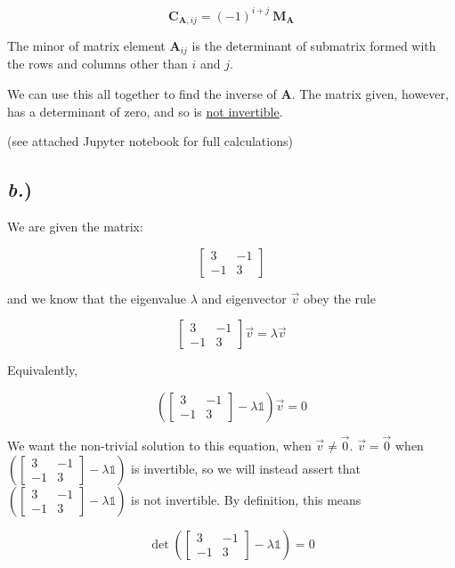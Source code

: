 \documentclass{article}
\begin{document}
$$ \textbf{C}_{\textbf{A},ij} = (-1)^{i+j} \ \textbf{M}_{\textbf{A}} $$

The minor of matrix element $\textbf{A}_{ij}$ is the determinant of submatrix formed with the rows and columns other than $i$ and $j$.

We can use this all together to find the inverse of $\textbf{A}$. The matrix given, however, has a determinant of zero, and so is \underline{not invertible}.

(see attached Jupyter notebook for full calculations)


\subsection*{\textit{b.})}

We are given the matrix:

$$\begin{bmatrix}
3 	&	-1	\\
-1	&	3	\end{bmatrix}$$

and we know that the eigenvalue $\lambda$ and eigenvector $\vec{v}$ obey the rule

$$\begin{bmatrix}
3 	&	-1	\\
-1	&	3	\end{bmatrix}\vec{v} = \lambda \vec{v}$$

Equivalently, 

$$\left(\begin{bmatrix}
3 	&	-1	\\
-1	&	3	\end{bmatrix} - \lambda\mathbb{1}\right)\vec{v} = 0$$

We want the non-trivial solution to this equation, when $\vec{v} \neq \vec{0}$. $\vec{v} = \vec{0}$ when $\left(\begin{bmatrix}
3 	&	-1	\\
-1	&	3	\end{bmatrix} - \lambda\mathbb{1}\right)$ is invertible, so we will instead assert that $\left(\begin{bmatrix}
3 	&	-1	\\
-1	&	3	\end{bmatrix} - \lambda\mathbb{1}\right)$ is not invertible. By definition, this means 

$$ \det\left(\begin{bmatrix}
3 	&	-1	\\
-1	&	3	\end{bmatrix} - \lambda\mathbb{1}\right) = 0 $$
\end{document}
